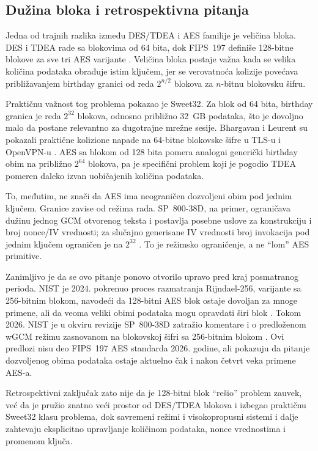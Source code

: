 \subsection{Dužina bloka i retrospektivna pitanja}

Jedna od trajnih razlika između DES/TDEA i AES familije je veličina
bloka. DES i TDEA rade sa blokovima od 64 bita, dok FIPS~197 definiše
128-bitne blokove za sve tri AES varijante
\cite{nist_fips197_2023}. Veličina bloka postaje važna kada se velika
količina podataka obrađuje istim ključem, jer se verovatnoća kolizije
povećava približavanjem birthday granici od reda $2^{n/2}$ blokova za
$n$-bitnu blokovsku šifru.

Praktičnu važnost tog problema pokazao je Sweet32. Za blok od 64 bita,
birthday granica je reda $2^{32}$ blokova, odnosno približno 32~GB
podataka, što je dovoljno malo da postane relevantno za dugotrajne
mrežne sesije. Bhargavan i Leurent su pokazali praktične kolizione
napade na 64-bitne blokovske šifre u TLS-u i OpenVPN-u
\cite{bhargavan2016sweet32}. AES sa blokom od 128 bita pomera
analogni generički birthday obim na približno $2^{64}$ blokova, pa je
specifični problem koji je pogodio TDEA pomeren daleko izvan uobičajenih
količina podataka.

To, međutim, ne znači da AES ima neograničen dozvoljeni obim pod jednim
ključem. Granice zavise od režima rada. SP~800-38D, na primer, ograničava
dužinu jednog GCM otvorenog teksta i postavlja posebne uslove za konstrukciju
i broj nonce/IV vrednosti; za slučajno generisane IV vrednosti broj
invokacija pod jednim ključem ograničen je na $2^{32}$
\cite{nist_sp80038d}. To je režimsko ograničenje, a ne ``lom'' AES
primitive.

Zanimljivo je da se ovo pitanje ponovo otvorilo upravo pred kraj
posmatranog perioda. NIST je 2024. pokrenuo proces razmatranja
Rijndael-256, varijante sa 256-bitnim blokom, navodeći da 128-bitni AES
blok ostaje dovoljan za mnoge primene, ali da veoma veliki obimi podataka
mogu opravdati širi blok \cite{nist_sp800197_predraft}. Tokom 2026.
NIST je u okviru revizije SP~800-38D zatražio komentare i o predloženom
wGCM režimu zasnovanom na blokovskoj šifri sa 256-bitnim blokom
\cite{nist_wgcm_2026}. Ovi predlozi nisu deo FIPS~197 AES standarda
2026. godine, ali pokazuju da pitanje dozvoljenog obima podataka ostaje
aktuelno čak i nakon četvrt veka primene AES-a.

Retrospektivni zaključak zato nije da je 128-bitni blok ``rešio'' problem
zauvek, već da je pružio znatno veći prostor od DES/TDEA blokova i
izbegao praktičnu Sweet32 klasu problema, dok savremeni režimi i
visokopropusni sistemi i dalje zahtevaju eksplicitno upravljanje
količinom podataka, nonce vrednostima i promenom ključa.


